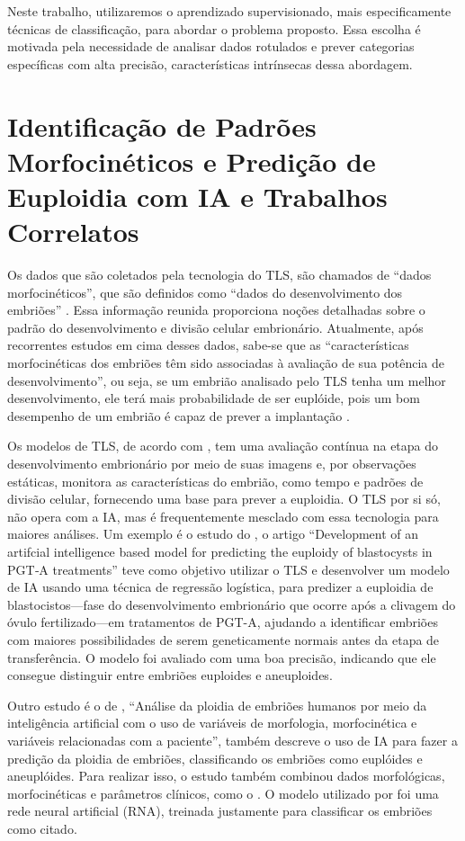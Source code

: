 Neste trabalho, utilizaremos o aprendizado supervisionado, mais especificamente técnicas de classificação, para abordar o problema proposto. Essa escolha é motivada pela necessidade de analisar dados rotulados e prever categorias específicas com alta precisão, características intrínsecas dessa abordagem.

\section{Identificação de Padrões Morfocinéticos e Predição de Euploidia com IA e Trabalhos Correlatos}

Os dados que são coletados pela tecnologia do TLS, são chamados de “dados morfocinéticos”, que são definidos como “dados do desenvolvimento dos embriões” \cite{oliveira2024}. Essa informação reunida proporciona noções detalhadas sobre o padrão do desenvolvimento e divisão celular embrionário. Atualmente, após recorrentes estudos em cima desses dados, sabe-se que as “características morfocinéticas dos embriões têm sido associadas à avaliação de sua potência de desenvolvimento”, ou seja, se um embrião analisado pelo TLS tenha um melhor desenvolvimento, ele terá mais probabilidade de ser euplóide, pois um bom desempenho de um embrião é capaz de prever a implantação \cite{yuan2023}.

Os modelos de TLS, de acordo com , tem uma avaliação contínua na etapa do desenvolvimento embrionário por meio de suas imagens e, por observações estáticas, monitora as características do embrião, como tempo e padrões de divisão celular, fornecendo uma base para prever a euploidia. O TLS por si só, não opera com a IA, mas é frequentemente mesclado com essa tecnologia para maiores análises. Um exemplo é o estudo do , o artigo “Development of an artifcial intelligence based model for predicting the euploidy of blastocysts in PGT‐A treatments” teve como objetivo utilizar o TLS e desenvolver um modelo de IA usando uma técnica de regressão logística, para predizer a euploidia de blastocistos—fase do desenvolvimento embrionário que ocorre após a clivagem do óvulo fertilizado—em tratamentos de PGT-A, ajudando a identificar embriões com maiores possibilidades de serem geneticamente normais antes da etapa de transferência. O modelo foi avaliado com uma boa precisão, indicando que ele consegue distinguir entre embriões euploides e aneuploides.

Outro estudo é o de , “Análise da ploidia de embriões humanos por meio da inteligência artificial com o uso de variáveis de morfologia, morfocinética e variáveis relacionadas com a paciente”, também descreve o uso de IA para fazer a predição da ploidia de embriões, classificando os embriões como euplóides e aneuplóides. Para realizar isso, o estudo também combinou dados morfológicas, morfocinéticas e parâmetros clínicos, como o . O modelo utilizado por foi uma rede neural artificial (RNA), treinada justamente para classificar os embriões como citado.

